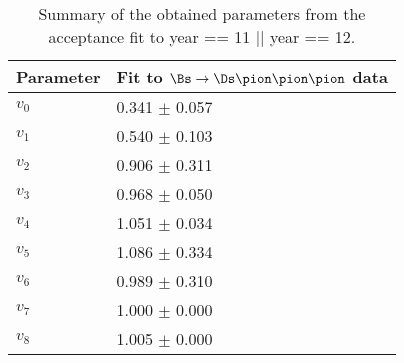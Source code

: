 \begin{table}[h]
\centering
\begin{tabular}{l l}
Parameter & Fit to $\Bs\to\Ds\pion\pion\pion$ data \\
\hline
$v_{0}$ & 0.341 $\pm$ 0.057\\
$v_{1}$ & 0.540 $\pm$ 0.103\\
$v_{2}$ & 0.906 $\pm$ 0.311\\
$v_{3}$ & 0.968 $\pm$ 0.050\\
$v_{4}$ & 1.051 $\pm$ 0.034\\
$v_{5}$ & 1.086 $\pm$ 0.334\\
$v_{6}$ & 0.989 $\pm$ 0.310\\
$v_{7}$ & 1.000 $\pm$ 0.000\\
$v_{8}$ & 1.005 $\pm$ 0.000\\
\end{tabular}
\caption{Summary of the obtained parameters from the acceptance fit to  year == 11 || year == 12.} 
\label{table: Splines}
\end{table}
